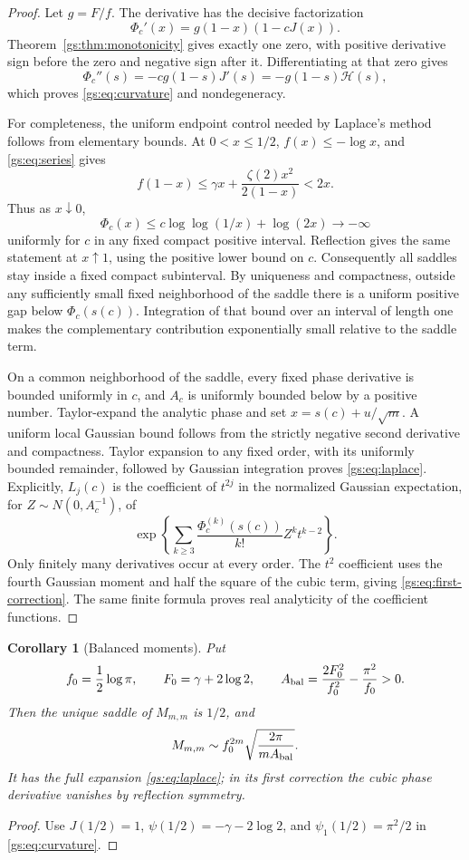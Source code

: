 \documentclass[11pt,a4paper]{article}
\numberwithin{equation}{section}
\theoremstyle{plain}
\newtheorem{corollary}[theorem]{Corollary}
\theoremstyle{definition}
\theoremstyle{remark}
\begin{document}
\begin{proof}
Let $g=F/f$. The derivative has the decisive factorization
\[
 \Phi_c'(x)=g(1-x)(1-cJ(x)).
\]
Theorem~\ref{gs:thm:monotonicity} gives exactly one zero, with
positive derivative sign before the zero and negative sign after it.
Differentiating at that zero gives
\[
 \Phi_c''(s)=-c g(1-s)J'(s)
           =-g(1-s)\mathcal H(s),
\]
which proves \eqref{gs:eq:curvature} and nondegeneracy.

For completeness, the uniform endpoint control needed by Laplace's
method follows from elementary bounds. At $0<x\le1/2$,
$f(x)\le-\log x$, and \eqref{gs:eq:series} gives
\[
 f(1-x)\le\gamma x+\frac{\zeta(2)x^2}{2(1-x)}<2x.
\]
Thus as $x\downarrow0$,
\[
 \Phi_c(x)\le c\log\log(1/x)+\log(2x)\longrightarrow-\infty
\]
uniformly for $c$ in any fixed compact positive interval. Reflection
gives the same statement at $x\uparrow1$, using the positive lower
bound on $c$. Consequently all saddles stay inside a fixed compact
subinterval. By uniqueness and compactness, outside any sufficiently
small fixed neighborhood of the saddle there is a uniform positive
gap below $\Phi_c(s(c))$. Integration of that bound over an interval
of length one makes the complementary contribution exponentially
small relative to the saddle term.

On a common neighborhood of the saddle, every fixed phase derivative
is bounded uniformly in $c$, and $A_c$ is uniformly bounded below by a
positive number. Taylor-expand the analytic phase and set
$x=s(c)+u/\sqrt m$. A uniform local Gaussian bound follows from the
strictly negative second derivative and compactness. Taylor expansion
to any fixed order, with its uniformly bounded remainder, followed by
Gaussian integration proves \eqref{gs:eq:laplace}.
Explicitly, $L_j(c)$ is the coefficient of $t^{2j}$ in the normalized
Gaussian expectation, for $Z\sim N(0,A_c^{-1})$, of
\[
 \exp\left\{\sum_{k\ge3}
      \frac{\Phi_c^{(k)}(s(c))}{k!}Z^k t^{k-2}\right\}.
\]
Only finitely many derivatives occur at every order. The $t^2$
coefficient uses the fourth Gaussian moment and half the square of
the cubic term, giving \eqref{gs:eq:first-correction}. The same
finite formula proves real analyticity of the coefficient functions.
\end{proof}

\begin{corollary}[Balanced moments]\label{gs:cor:balanced}
Put
\[
 f_0=\frac12\log\pi,\qquad F_0=\gamma+2\log2,\qquad
 A_{\rm bal}=\frac{2F_0^2}{f_0^2}-\frac{\pi^2}{f_0}>0.
\]
Then the unique saddle of $M_{m,m}$ is $1/2$, and
\[
 M_{m,m}\sim
 f_0^{2m}\sqrt{\frac{2\pi}{mA_{\rm bal}}}.
\]
It has the full expansion \eqref{gs:eq:laplace}; in its first correction
the cubic phase derivative vanishes by reflection symmetry.
\end{corollary}
\begin{proof}
Use $J(1/2)=1$, $\psi(1/2)=-\gamma-2\log2$, and
$\psi_1(1/2)=\pi^2/2$ in \eqref{gs:eq:curvature}.
\end{proof}
\end{document}
